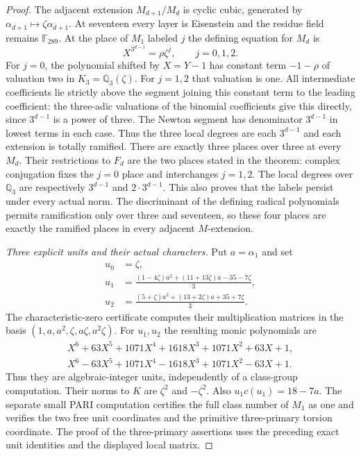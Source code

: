 \begin{proof}
The adjacent extension $M_{d+1}/M_d$ is cyclic cubic, generated by
$\alpha_{d+1}\mapsto\zeta\alpha_{d+1}$.
At seventeen every layer is Eisenstein and the residue field
remains $\mathbb F_{289}$.
At the place of $M_1$ labeled $j$ the defining equation for $M_d$ is
\[
       X^{3^{d-1}}=\rho\zeta^j,\qquad j=0,1,2.
 \tag{E110.13}
\]
For $j=0$, the polynomial shifted by $X=Y-1$ has constant
term $-1-\rho$ of valuation two in $K_3=\mathbb Q_3(\zeta)$.
For $j=1,2$ that valuation is one.
All intermediate coefficients lie strictly above the segment
joining this constant term to the leading coefficient:
the three-adic valuations of the binomial coefficients give this
directly, since $3^{d-1}$ is a power of three.
The Newton segment has denominator $3^{d-1}$ in lowest terms
in each case. Thus the three local degrees are each
$3^{d-1}$ and each extension is totally ramified.
There are exactly three places over three at every $M_d$.
Their restrictions to $F_d$ are the two places stated in the theorem:
complex conjugation fixes the $j=0$ place and interchanges
$j=1,2$. The local degrees over $\mathbb Q_3$ are respectively
$3^{d-1}$ and $2\cdot3^{d-1}$.
This also proves that the labels persist under every actual norm.
The discriminant of the defining radical polynomials permits
ramification only over three and seventeen, so these four places
are exactly the ramified places in every adjacent $M$-extension.

\emph{Three explicit units and their actual characters.}
Put $a=\alpha_1$ and set
\[
 \begin{split}
 u_0&=\zeta,\\
 u_1&=\frac{(1-4\zeta)a^2+(11+13\zeta)a-35-7\zeta}{3},\\
 u_2&=\frac{(5+\zeta)a^2+(13+2\zeta)a+35+7\zeta}{3}.
 \end{split}
 \tag{E110.14}
\]
The characteristic-zero certificate computes their multiplication
matrices in the basis
$(1,a,a^2,\zeta,a\zeta,a^2\zeta)$.
For $u_1,u_2$ the resulting monic polynomials are
\[
 \begin{split}
 X^6+63X^5+1071X^4+1618X^3+1071X^2+63X+1,\\
 X^6-63X^5+1071X^4-1618X^3+1071X^2-63X+1.
 \end{split}
 \tag{E110.15}
\]
Thus they are algebraic-integer units, independently of a
class-group computation. Their norms to $K$ are
$\zeta^2$ and $-\zeta^2$.
Also $u_1c(u_1)=18-7a$.
The separate small PARI computation certifies the full
class number of $M_1$ as one and verifies the two free unit
coordinates and the primitive three-primary torsion coordinate.
The proof of the three-primary assertions uses the preceding
exact unit identities and the displayed local matrix.


\end{proof}
